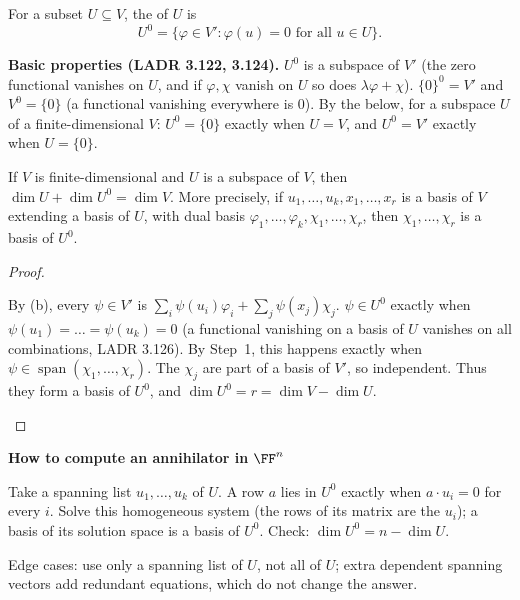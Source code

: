 \documentclass[10pt]{scrartcl}
\DeclareMathOperator{\spn}{span}\DeclareMathOperator{\nul}{null}\DeclareMathOperator{\range}{range}
\newenvironment{methodbox}[1]{\begin{mdframed}[style=methodstyle]\textbf{\color{NavyBlue}#1}\par\vspace{2pt}}{\end{mdframed}}
\begin{document}
\begin{definition*}
  For a subset $U\subseteq V$, the  of $U$ is
  \[
    U^0 = \{\varphi\in V' : \varphi(u) = 0 \text{ for all } u\in U\}.
  \]
\end{definition*}

\textbf{Basic properties (LADR 3.122, 3.124).} $U^0$ is a subspace of $V'$ (the zero functional vanishes on $U$, and if $\varphi,\chi$ vanish on $U$ so does $\lambda\varphi+\chi$). $\{0\}^0=V'$ and $V^0=\{0\}$ (a functional vanishing everywhere is $0$). By the  below, for a subspace $U$ of a finite-dimensional $V$: $U^0=\{0\}$ exactly when $U=V$, and $U^0=V'$ exactly when $U=\{0\}$.

\begin{proposition*}
  If $V$ is finite-dimensional and $U$ is a subspace of $V$, then $\dim U + \dim U^0 = \dim V$. More precisely, if $u_1,\dots,u_k,x_1,\dots,x_r$ is a basis of $V$ extending a basis of $U$, with dual basis $\varphi_1,\dots,\varphi_k,\chi_1,\dots,\chi_r$, then $\chi_1,\dots,\chi_r$ is a basis of $U^0$.
\end{proposition*}
\begin{proof}
  \begin{steps}
    \ii By (b), every $\psi\in V'$ is $\sum_i\psi(u_i)\varphi_i+\sum_j\psi(x_j)\chi_j$.
    \ii $\psi\in U^0$ exactly when $\psi(u_1)=\dots=\psi(u_k)=0$ (a functional vanishing on a basis of $U$ vanishes on all combinations, LADR 3.126). By Step~1, this happens exactly when $\psi\in\spn(\chi_1,\dots,\chi_r)$.
    \ii The $\chi_j$ are part of a basis of $V'$, so independent. Thus they form a basis of $U^0$, and $\dim U^0=r=\dim V-\dim U$.
  \end{steps}
\end{proof}

\begin{methodbox}{How to compute an annihilator in $\FF^n$}
  \begin{steps}
    \ii Take a spanning list $u_1,\dots,u_k$ of $U$. A row $a$ lies in $U^0$ exactly when $a\cdot u_i=0$ for every $i$.
    \ii Solve this homogeneous system (the rows of its matrix are the $u_i$); a basis of its solution space is a basis of $U^0$.
    \ii Check: $\dim U^0=n-\dim U$.
  \end{steps}
  Edge cases: use only a spanning list of $U$, not all of $U$; extra dependent spanning vectors add redundant equations, which do not change the answer.
\end{methodbox}
\end{document}
